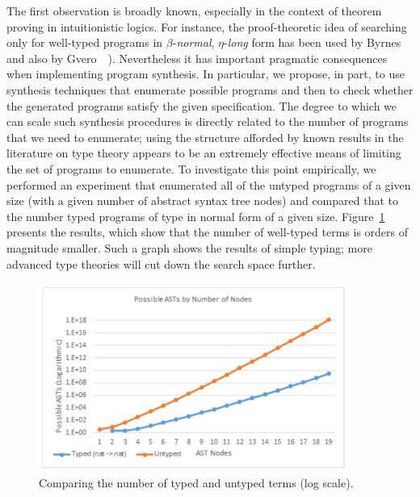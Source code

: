 The first observation is broadly known, especially in the context of
theorem proving in intuitionistic logics.  For instance, the
proof-theoretic idea of searching only for well-typed programs in
$\beta$-\textit{normal}, $\eta$-\textit{long} form has been used by
Byrnes~\etal~\cite{byrnes-1999} and also by
Gvero~\etal~\cite{gvero-pldi-2013}).  Nevertheless it has
important pragmatic consequences when implementing program synthesis.
In particular, we propose, in part, to use synthesis techniques that 
enumerate possible programs and then to check whether the generated programs
satisfy the given specification.  The degree to which we can scale
such synthesis procedures is directly related to the number of
programs that we need to enumerate; using the structure afforded by
known results in the literature on type theory appears to be an
extremely effective means of limiting the set of programs to
enumerate.  To investigate this point empirically, we performed an
experiment that enumerated all of the untyped programs of a given size
(with a given number of abstract syntax tree nodes) and compared that
to the number typed programs of type  in normal form of a given size.
Figure~\ref{fig:counting} presents the results, which show that the
number of well-typed terms is orders of magnitude smaller.  Such a graph
shows the results of simple typing; more advanced type theories will
cut down the search space further.

\begin{figure}[t]
\begin{center}
\includegraphics[width=4in]{enumeration-cropped.pdf}
\end{center}
\caption{Comparing the number of typed and untyped terms (log scale). }
\label{fig:counting}
\end{figure}

